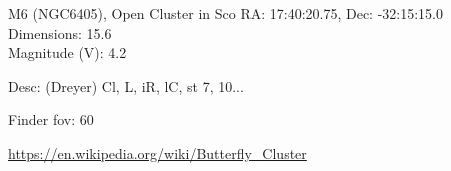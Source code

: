 \begin{block}{M6 (NGC6405), Open Cluster in Sco}
    RA: 17:40:20.75, Dec: -32:15:15.0 \\ 
    Dimensions: 15.6 \\ 
    Magnitude (V): 4.2


    Desc: (Dreyer) Cl, L, iR, lC, st 7, 10... 

    Finder fov: 60 

    \url{https://en.wikipedia.org/wiki/Butterfly_Cluster} 
\end{block}